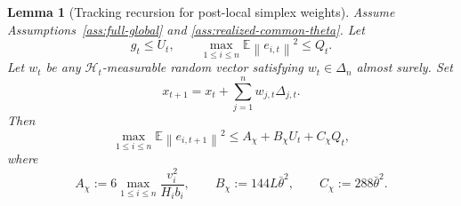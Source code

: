 \documentclass{article}
\newtheorem{lemma}[theorem]{Lemma}
\theoremstyle{definition}
\newcommand{\EE}{\mathbb E}
\newcommand{\norm}[1]{\left\lVert #1\right\rVert}
\begin{document}
\begin{lemma}[Tracking recursion for post-local simplex weights]
\label{lem:realized-het-tracking}
Assume Assumptions~\ref{ass:full-global} and \ref{ass:realized-common-theta}. Let
\[
g_t\le U_t,
\qquad
\max_{1\le i\le n}\EE\norm{e_{i,t}}^2\le Q_t.
\]
Let $w_t$ be any $\mathcal H_t$-measurable random vector satisfying $w_t\in\Delta_n$ almost surely.
Set
\begin{equation}
x_{t+1}=x_t+\sum_{j=1}^n w_{j,t}\Delta_{j,t}.
\label{eq:realized-het-tracking-update}\end{equation}
Then
\begin{equation}
\max_{1\le i\le n}\EE\norm{e_{i,t+1}}^2
\le
A_\chi+B_\chi U_t+C_\chi Q_t,
\label{eq:realized-het-tracking}\end{equation}
where
\[
A_\chi:=6\max_{1\le i\le n}\frac{v_i^2}{H_i b_i},
\qquad
B_\chi:=144L\bar\theta^2,
\qquad
C_\chi:=288\bar\theta^2.
\]
\end{lemma}
\end{document}
